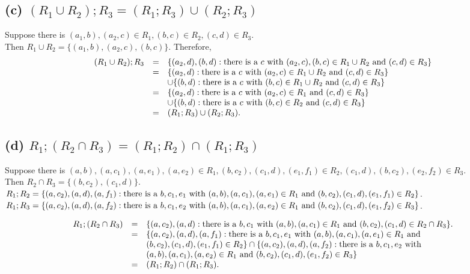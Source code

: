 \documentclass[]{article}
\begin{document}
\begin{spacing}{1.5}
\subsection*{(c) $ (R_1 \cup R_2) ; R_3 = (R_1; R_3) \cup (R_2; R_3)$}
Suppose there is $ (a_1, b), (a_2, c) \in R_1, (b, c) \in R_2, (c, d) \in R_3 $.\\
Then $ R_1 \cup R_2 = \{(a_1, b), (a_2, c), (b, c)\} $. Therefore,
\[\begin{array}{rcl}
	(R_1 \cup R_2); R_3 &=& \{(a_2, d), (b, d) : \text{there is a $ c $ with } (a_2, c), (b, c) \in R_1 \cup R_2 \text{ and } (c, d) \in R_3\}\\
	&=& \{(a_2, d) : \text{there is a $ c $ with } (a_2, c) \in R_1 \cup R_2 \text{ and } (c, d) \in R_3\} \\
	&&\cup \{(b, d) : \text{there is a $ c $ with } (b, c) \in R_1 \cup R_2 \text{ and } (c, d) \in R_3\}\\
	&=& \{(a_2, d) : \text{there is a $ c $ with } (a_2, c) \in R_1  \text{ and } (c, d) \in R_3\} \\
	&&\cup \{(b, d) : \text{there is a $ c $ with } (b, c) \in R_2 \text{ and } (c, d) \in R_3\}\\
	&=& (R_1; R_3) \cup (R_2; R_3).
\end{array}\]

\subsection*{(d) $ R_1; (R_2 \cap R_3) = (R_1; R_2) \cap (R_1; R_3)$}
Suppose there is $ (a, b), (a, c_1), (a, e_1), (a, e_2) \in R_1, (b, c_2),  (c_1, d), (e_1, f_1) \in R_2, (c_1, d),  (b, c_2), (e_2, f_2) \in R_3 $.\\
Then $ R_2 \cap R_3 = \{(b, c_2), (c_1, d)\}.$\\
$ R_1; R_2 = \{(a, c_2), (a, d), (a, f_1) : \text{there is a $ b, c_1, e_1  $ with } (a, b), (a, c_1), (a, e_1) \in R_1 \text{ and } (b, c_2), (c_1, d), (e_1, f_1) \in R_2\} $.\\
$ R_1; R_3 = \{(a, c_2), (a, d), (a, f_2) : \text{there is a $ b, c_1, e_2  $ with } (a, b), (a, c_1), (a, e_2) \in R_1 \text{ and } (b, c_2), (c_1, d), (e_1, f_2) \in R_3\} $.

\[
\begin{array}{rcl}
	 R_1; (R_2 \cap R_3) &=& \{(a, c_2), (a, d) : \text{there is a $ b, c_1 $ with } (a, b), (a, c_1) \in R_1 \text{ and } (b, c_2), (c_1, d) \in R_2 \cap R_3\} .\\
	 &=& \{(a, c_2), (a, d), (a, f_1) : \text{there is a $ b, c_1, e_1 $ with } (a, b), (a, c_1), (a, e_1) \in R_1 \text{ and } \\
	 &&(b, c_2), (c_1, d), (e_1, f_1) \in R_2 \}  \cap  \{(a, c_2), (a, d), (a, f_2) : \text{there is a $ b, c_1, e_2  $ with } \\
	 &&(a, b), (a, c_1), (a, e_2) \in R_1 \text{ and } (b, c_2), (c_1, d), (e_1, f_2) \in R_3\} \\
	 &=& (R_1; R_2) \cap (R_1; R_3).
\end{array}
\]



\end{spacing}
\end{document}

